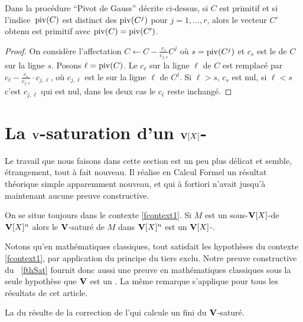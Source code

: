 \begin{flemma} \label{flemPivG}
Dans la procédure ``Pivot de Gauss'' décrite ci-dessus, si $C$ est primitif et si l'indice~$\mathrm{piv}(C)$ est distinct des  $\mathrm{piv}(C^j)$
pour $j=1,\dots,r$, alors le vecteur $C'$ obtenu est primitif avec $\mathrm{piv}(C)=\mathrm{piv}(C')$.  
\end{flemma}
%
\begin{proof}{}
On considère l'affectation $C\leftarrow C- \frac{c_s}{c_{j,s}} C^j$ où $s=\mathrm{piv}(C^j)$
et $c_s$ est le \coe de $C$ sur la ligne $s$.
Posons $\ell=\mathrm{piv}(C)$. Le \coe $c_\ell$ sur la ligne $\ell$ de $C$ est  remplacé par $c_\ell - \frac{c_s}{c_{j,s}}\cdot c_{j,\ell}$, où $c_{j,\ell}$ est le \coe  sur la ligne $\ell $ de $C^j$.
Si $\ell >s$, $c_s$
est \rdt nul, si $\ell <s$ c'est $c_{j,\ell}$ qui est \rdt nul, dans les deux cas le \coe $c_\ell$ reste \rdt
inchangé.  
\end{proof}
%
 

\section{La $\mathbf{V}$-saturation d'un $\mathbf{V}[X]$-\mtf} \label{fsatVXmotf}

Le travail que nous faisons dans cette section est un peu plus délicat
et semble, étrangement, tout à fait nouveau. Il réalise 
en Calcul Formel un résultat
théorique simple apparemment nouveau, et qui à fortiori n'avait jusqu'à maintenant aucune preuve constructive.

\begin{ftheorem} \label{fthSat} On se situe toujours dans le contexte \ref{fcontext1}.
Si $M$ est un sous-$\mathbf{V}[X]$-\mtf de~$\mathbf{V}[X]^n$ alors le $\mathbf{V}$-saturé de 
$M$ dans  $\mathbf{V}[X]^n$ est \egmt un $\mathbf{V}[X]$-\mtf.  
\end{ftheorem}

 Notons qu'en mathématiques classiques, tout \ddv satisfait les hypothèses du contexte \ref{fcontext1}, par application du principe du tiers exclu.
Notre preuve constructive du \tho~\ref{fthSat} fournit donc aussi
une preuve en mathématiques classiques sous la seule hypothèse que $\mathbf{V}$
est un \ddv. La m\^eme remarque s'applique pour tous les résultats de cet article.

\medskip La \dem du \tho résulte de la correction 
de l'\algo qui calcule un \sgr fini du  $\mathbf{V}$-saturé.

